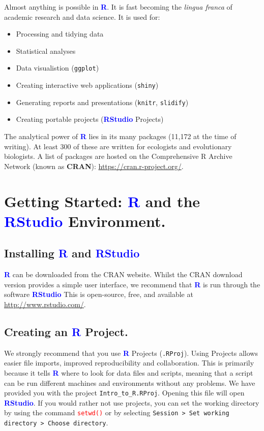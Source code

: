\documentclass[a4paper,12pt]{article}
\newcommand\boldblue[1]{\textcolor{blue}{\textbf{#1}}}
\newcommand\code[1]{\textcolor{red}{\texttt{#1}}}
\begin{document}
Almost anything is possible in \boldblue{R}. It is fast becoming the \textit{lingua franca} of academic research and data science. It is used for:

\begin{itemize}
\item Processing and tidying data 
\item Statistical analyses
\item Data visualistion (\texttt{ggplot})
\item Creating interactive web applications (\texttt{shiny})
\item Generating reports and presentations (\texttt{knitr}, \texttt{slidify})
\item Creating portable projects (\boldblue{RStudio} Projects)
\end{itemize}

The analytical power of \boldblue{R} lies in its many packages (11,172 at the time of writing). At least 300 of these are written for ecologists and evolutionary biologists. A list of packages are hosted on the Comprehensive R Archive Network (known as \textbf{CRAN}): \url{https://cran.r-project.org/}.


\section {Getting Started: \boldblue{R} and the \boldblue{RStudio} Environment.}
\subsection {Installing \boldblue{R} and \boldblue{RStudio}}

\boldblue{R} can be downloaded from the CRAN website. Whilst the CRAN download version provides a simple user interface, we recommend that \boldblue{R} is run through the software \boldblue{RStudio} This is open-source, free, and available at \url{http://www.rstudio.com/}.


\subsection {Creating an \boldblue{R} Project.}

We strongly recommend that you use \boldblue{R} Projects (\texttt{.RProj}). Using Projects allows easier file imports, improved reproducibility and collaboration. This is primarily because it tells \boldblue{R} where to look for data files and scripts, meaning that a script can be run different machines and environments without any problems. We have provided you with the project \texttt{Intro\_to\_R.RProj}. Opening this file will open \boldblue{RStudio}. If you would rather not use projects, you can set the working directory by using the command \code{setwd()} or by selecting \texttt{Session > Set working directory > Choose directory}. \\
\end{document}
